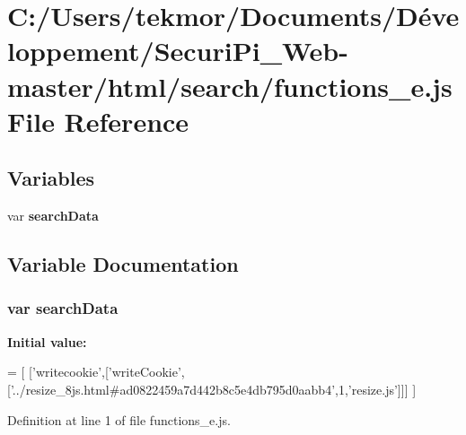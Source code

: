 \section{C\+:/\+Users/tekmor/\+Documents/\+Développement/\+Securi\+Pi\+\_\+\+Web-\/master/html/search/functions\+\_\+e.js File Reference}
\label{functions__e_8js}
\subsection*{Variables}
\begin{DoxyCompactItemize}
\item 
var {\bf search\+Data}
\end{DoxyCompactItemize}


\subsection{Variable Documentation}
\subsubsection[{search\+Data}]{\setlength{\rightskip}{0pt plus 5cm}var search\+Data}\label{functions__e_8js_ad01a7523f103d6242ef9b0451861231e}
{\bfseries Initial value\+:}
\begin{DoxyCode}
=
[
  [\textcolor{stringliteral}{'writecookie'},[\textcolor{stringliteral}{'writeCookie'},[\textcolor{stringliteral}{'../resize\_8js.html#ad0822459a7d442b8c5e4db795d0aabb4'},1,\textcolor{stringliteral}{'resize.js'}]]]
]
\end{DoxyCode}


Definition at line 1 of file functions\+\_\+e.\+js.


